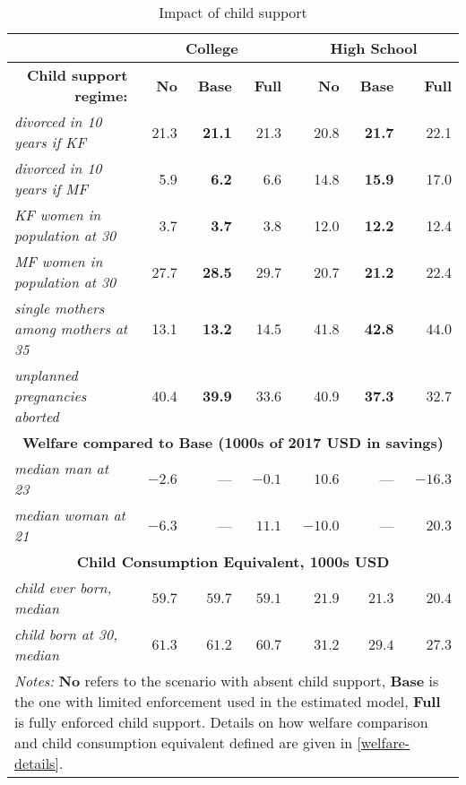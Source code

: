 \documentclass[12pt,letter]{article}
\begin{document}
\begin{table}
\begin{center}
\caption{Impact of child support \label{child-support-table}}
\begin{tabular}{l r r r | r r r}\hline
& \multicolumn{3}{c|}{\textbf{College}} & \multicolumn{3}{c}{\textbf{High School}}\\\hline
\multicolumn{1}{r}{\textbf{Child support regime:}} &\textbf{No} & \textbf{Base}& \textbf{Full}  &\textbf{No} & \textbf{Base}& \textbf{Full}\\\hline
\textit{divorced in 10 years if KF} & 21.3 & \textbf{21.1} & 21.3 & 20.8 & \textbf{21.7} & 22.1 \\
\textit{divorced in 10 years if MF} & 5.9 & \textbf{6.2} & 6.6 & 14.8 & \textbf{15.9} & 17.0 \\
\textit{KF women in population at 30} & 3.7 & \textbf{3.7} & 3.8 & 12.0 & \textbf{12.2} & 12.4 \\
\textit{MF women in population at 30} & 27.7 & \textbf{28.5} & 29.7 & 20.7 & \textbf{21.2} & 22.4 \\
\textit{single mothers among mothers at 35} & 13.1 & \textbf{13.2} & 14.5 & 41.8 & \textbf{42.8} & 44.0 \\
\textit{unplanned pregnancies aborted} & 40.4 & \textbf{39.9} & 33.6 & 40.9 & \textbf{37.3} & 32.7 \\\hline
\multicolumn{7}{c}{\textbf{Welfare compared to Base (1000s of 2017 USD in savings)}} \\\hline
\textit{median man at 23} & $-2.6$ &--- & $-0.1$ & $10.6$ & --- & $-16.3$\\
\textit{median woman at 21} & $-6.3$ & --- & $11.1$ & $-10.0$ & --- & $20.3$ \\\hline
\multicolumn{7}{c}{\textbf{Child Consumption Equivalent, 1000s USD}} \\\hline
\textit{child ever born, median} & $59.7$ & $59.7$ & $59.1$ & $21.9$ & $21.3$ & $20.4$\\
\textit{child born at 30, median} & $61.3$ & $61.2$ & $60.7$ & $31.2$ & $29.4$ & $27.3$\\\hline
\hline
\multicolumn{7}{p{0.9\linewidth}}{\footnotesize \textit{Notes:} \textbf{No} refers to the scenario with absent child support, \textbf{Base} is the one with limited enforcement used in the estimated model, \textbf{Full} is fully enforced child support. Details on how welfare comparison and child consumption equivalent defined  are given in \ref{welfare-details}.}\\\hline
\hline
\end{tabular}
\end{center}
\end{table}
\end{document}
